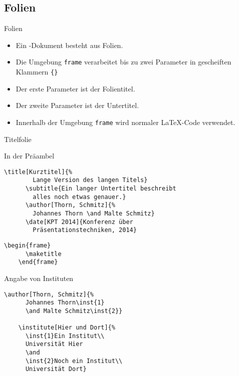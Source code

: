 \subsection{Folien}

\begin{Frame}[fragile]{Folien}
  \begin{itemize}
    \item Ein \beamer-Dokument besteht aus Folien.
    \item Die Umgebung \lstinline-frame- verarbeitet
      bis zu zwei Parameter in gescheiften Klammern \lstinline-{}-
    \item Der erste Parameter ist der Folientitel.
    \item Der zweite Parameter ist der Untertitel.
    \item Innerhalb der Umgebung \lstinline|frame| wird normaler \LaTeX-Code
      verwendet.
  \end{itemize}
\end{Frame}

\begin{Frame}[fragile]{Titelfolie}
  \begin{Block}{In der Präambel}
    \begin{lstlisting}[gobble=6,style=block]
      \title[Kurztitel]{%
        Lange Version des langen Titels}
      \subtitle{Ein langer Untertitel beschreibt
        alles noch etwas genauer.}
      \author[Thorn, Schmitz]{%
        Johannes Thorn \and Malte Schmitz}
      \date[KPT 2014]{Konferenz über
        Präsentationstechniken, 2014}
    \end{lstlisting}
  \end{Block}

  \begin{lstlisting}[gobble=4]
    \begin{frame}
      \maketitle
    \end{frame}
  \end{lstlisting}
\end{Frame}

\begin{Frame}[fragile]{Angabe von Instituten}
  \begin{lstlisting}[gobble=4]
    \author[Thorn, Schmitz]{%
      Johannes Thorn\inst{1}
      \and Malte Schmitz\inst{2}}

    \institute[Hier und Dort]{%
      \inst{1}Ein Institut\\
      Universität Hier
      \and
      \inst{2}Noch ein Institut\\
      Universität Dort}
  \end{lstlisting}
\end{Frame}

